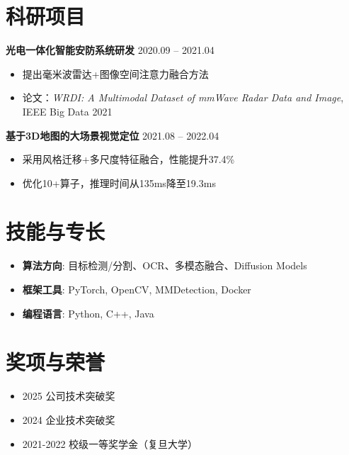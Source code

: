 \documentclass[a4paper,10pt]{article}
\begin{document}
\section*{科研项目}
\vspace{0.5em} %

\textbf{光电一体化智能安防系统研发} \hfill 2020.09 -- 2021.04
\begin{itemize}[leftmargin=*,topsep=4pt]
    \item 提出毫米波雷达+图像空间注意力融合方法
    \item 论文：\textit{WRDI: A Multimodal Dataset of mmWave Radar Data and Image}, IEEE Big Data 2021
\end{itemize}
\vspace{0.5em} %

\textbf{基于3D地图的大场景视觉定位} \hfill 2021.08 -- 2022.04
\begin{itemize}[leftmargin=*,topsep=4pt]
    \item 采用风格迁移+多尺度特征融合，性能提升37.4\%
    \item 优化10+算子，推理时间从135ms降至19.3ms
\end{itemize}

\section*{技能与专长}
\vspace{0.5em} %

\begin{itemize}[leftmargin=*,topsep=4pt]
    \item \textbf{算法方向}: 目标检测/分割、OCR、多模态融合、Diffusion Models
    \item \textbf{框架工具}: PyTorch, OpenCV, MMDetection, Docker
    \item \textbf{编程语言}: Python, C++, Java
\end{itemize}

\section*{奖项与荣誉}
\vspace{0.5em} %

\begin{itemize}[leftmargin=*,topsep=4pt]
    \item 2025 公司技术突破奖
    \item 2024 企业技术突破奖
    \item 2021-2022 校级一等奖学金（复旦大学）
\end{itemize}
\end{document}
